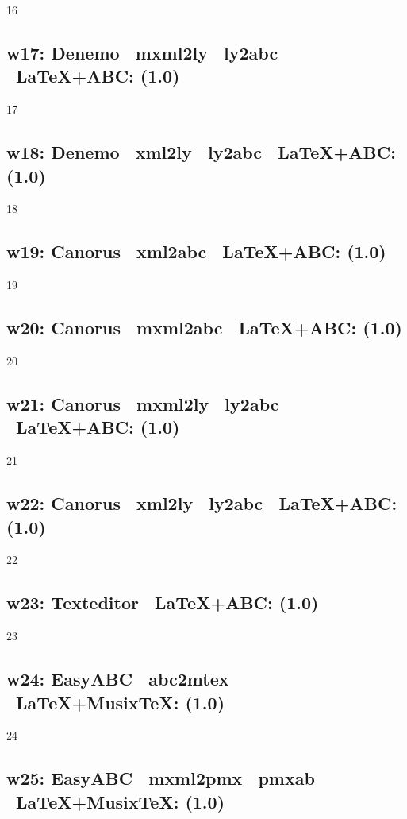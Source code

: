 16

\subsection{w17: Denemo \ra\ mxml2ly \ra\ ly2abc \ra\ \LaTeX+ABC: (1.0)} 

17

\subsection{w18: Denemo \ra\ xml2ly \ra\ ly2abc \ra\ \LaTeX+ABC: (1.0)} 

18

\subsection{w19: Canorus \ra\ xml2abc \ra\ \LaTeX+ABC: (1.0)} 

19

\subsection{w20: Canorus \ra\ mxml2abc \ra\ \LaTeX+ABC: (1.0)} 

20

\subsection{w21: Canorus \ra\ mxml2ly \ra\ ly2abc \ra\ \LaTeX+ABC: (1.0)} 

21

\subsection{w22: Canorus \ra\ xml2ly \ra\ ly2abc \ra\ \LaTeX+ABC: (1.0)} 

22

\subsection{w23: Texteditor \ra\ \LaTeX+ABC: (1.0)}

23

\subsection{w24: EasyABC \ra\ abc2mtex \ra\ \LaTeX+Musix\TeX: (1.0)} 

24

\subsection{w25: EasyABC \ra\ mxml2pmx \ra\ pmxab \ra\ \LaTeX+Musix\TeX: (1.0)} 

